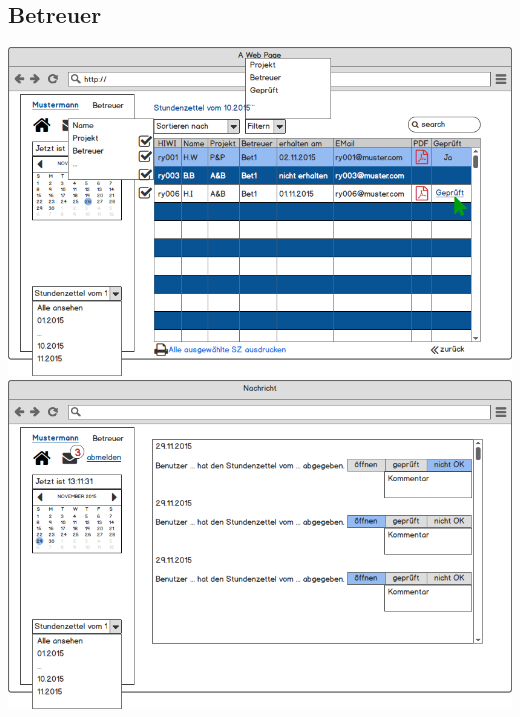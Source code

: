 \subsection{Betreuer}
\includegraphics[width=\linewidth]{UI/Betreuer/Hauptseite.png}\\
\includegraphics[width=\linewidth]{UI/Betreuer/Nachricht.png}

